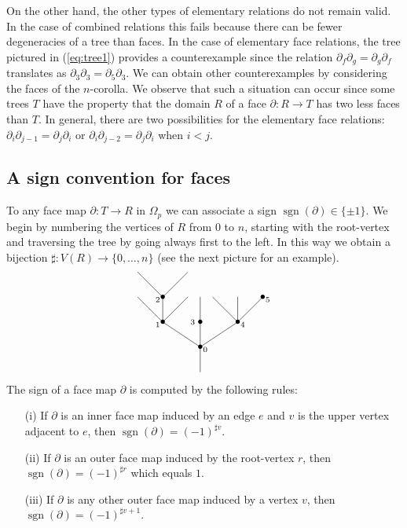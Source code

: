 \documentclass[a4paper]{amsart}
\theoremstyle{plain}
\theoremstyle{definition}
\theoremstyle{remark}
\DeclareMathOperator{\sgn}{sgn}
\newcommand{\rpd}{\Omega_p}
\newcommand{\To}{\longrightarrow}
\numberwithin{equation}{section}
\numberwithin{figure}{section}
\begin{document}
On the other hand, the other types of elementary relations do not
remain valid. In the case of combined relations this fails because
there can be fewer degeneracies of a tree than faces. In the case of
elementary face relations, the tree pictured in (\ref{eq:tree1})
provides a counterexample since the relation
$\partial_f\partial_g=\partial_g\partial_f$ translates as
$\partial_3\partial_3=\partial_5\partial_3$. We can obtain other
counterexamples by considering the faces of the $n$-corolla. We
observe that such a situation can occur since some trees $T$ have
the property that the domain $R$ of a face $\partial\colon R\To T$
has two less faces than $T$. In general, there are two possibilities
for the elementary face relations:
$\partial_i\partial_{j-1}=\partial_{j}\partial_i$ or
$\partial_i\partial_{j-2}=\partial_{j}\partial_i$ when $i< j$.

\subsection{A sign convention for faces}
To any face map  $\partial: T\To R$ in $\rpd$ we can associate a sign $\sgn(\partial)\in \{\pm 1\}$. We begin by
numbering the vertices of $R$ from $0$ to $n$, starting with the root-vertex and
traversing the tree by going always first to the left. In this way we obtain a bijection $\sharp:V(R)\To \{0,\ldots,n\}$
(see the next picture for an example).
$$
    \xy<0.08cm,0cm>:
    (25,0)*{}="1";
    (25,10)*=0{\bullet}="2";
    (10,20)*=0{\bullet}="3";
    (25,20)*=0{\bullet}="4";
    (40,20)*=0{\bullet}="5";
    (0,30)*=0{}="6";
    (10,30)*=0{\bullet}="7";
    (20,30)*=0{}="8";
    (25,30)*=0{}="9";
    (30,30)*=0{}="10";
    (40,30)*=0{}="11";
    (50,30)*=0{\bullet}="12";
    (0,40)*{}="13";
    (20,40)*{}="14";
    (27,9)*{\scriptstyle 0};
    (8,19)*{\scriptstyle 1};
    (8,29)*{\scriptstyle 2};
    (22,20)*{\scriptstyle 3};
    (42,19)*{\scriptstyle 4};
    (52,29)*{\scriptstyle 5};
    "1";"2" **\dir{-};
    "2";"3" **\dir{-};
    "2";"4" **\dir{-};
    "2";"5" **\dir{-};
    "3";"6" **\dir{-};
    "3";"7" **\dir{-};
    "3";"8" **\dir{-};
    "4";"9" **\dir{-};
    "5";"10" **\dir{-};
    "5";"11" **\dir{-};
    "5";"12" **\dir{-};
    "7";"13" **\dir{-};
    "7";"14" **\dir{-};
    \endxy
$$
The sign of a face map $\partial$ is computed by the following rules:
\begin{itemize}
    \item[{\rm (i)}] If $\partial$ is an inner face map induced by an edge $e$ and $v$ is the upper vertex adjacent to $e$, then
          $\sgn(\partial)=(-1)^{\sharp v}$.
    \item[{\rm (ii)}] If $\partial$ is an outer face map induced by the root-vertex $r$, then $\sgn(\partial)=(-1)^{\sharp r}$ which equals $1$.
    \item[{\rm (iii)}] If $\partial$ is any other outer face map induced by a vertex $v$, then $\sgn(\partial)=(-1)^{\sharp v+1}$.
\end{itemize}
\end{document}
